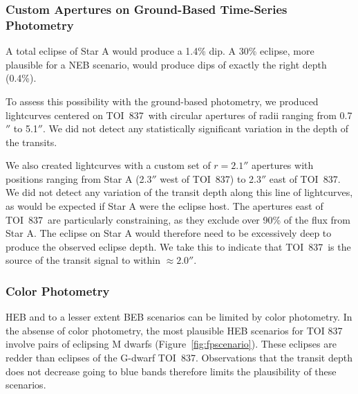 \documentclass[12pt,twocolumn,tighten]{aastex62}
\newcommand{\tn}{TOI~837} %
\begin{document}
\subsubsection{Custom Apertures on Ground-Based Time-Series Photometry}

A total eclipse of Star A would produce a 1.4\%
dip. A 30\% eclipse, more plausible for a NEB scenario, would produce
dips of exactly the right depth (0.4\%).

To assess this possibility with the ground-based photometry, we
produced lightcurves centered on \tn\ with
circular apertures of radii ranging from 0.7$''$ to 5.1$''$.
We did not detect any statistically significant variation in the depth
of the transits.

We also created lightcurves with a custom set of $r=2.1''$ apertures
with positions ranging from Star A (2.3$''$ west of \tn) to 2.3$''$
east of \tn.  We did not detect any variation of the transit depth
along this line of lightcurves, as would be expected if Star A were
the eclipse host.  The apertures east of \tn\ are particularly
constraining, as they exclude over 90\% of the flux from Star A.
The eclipse on Star A would therefore need to be excessively deep to
produce the observed eclipse depth.
We take this to indicate that \tn\ is the source of the transit signal
to within $\approx2.0''$.

\newpage
\subsubsection{Color Photometry}

HEB and to a lesser extent BEB scenarios can be limited
by color photometry.
In the absense of color photometry, the most plausible HEB scenarios for TOI
837 involve pairs of eclipsing M dwarfs (Figure~\ref{fig:fpscenario}).
These eclipses are redder than eclipses of the G-dwarf \tn.
Observations that the transit depth does not decrease
going to blue bands therefore limits the plausibility of these scenarios.
\end{document}
